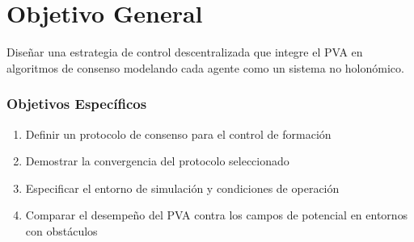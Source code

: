 \section{Objetivo General}
Diseñar una estrategia de control descentralizada que integre el PVA en algoritmos de consenso modelando cada agente como un sistema no holonómico.

\subsubsection{Objetivos Específicos}
\begin{enumerate}
    \item Definir un protocolo de consenso para el control de formación
    \item Demostrar la convergencia del protocolo seleccionado
    \item Especificar el entorno de simulación y condiciones de operación
    \item Comparar el desempeño del PVA contra los campos de potencial en entornos con obstáculos
\end{enumerate}
